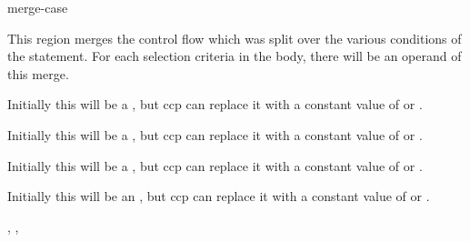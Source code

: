 \begin{instruction}{merge-case}

  \begin{notes}
    This region merges the control flow which was split over the
    various conditions of the  statement.  For each
    selection criteria in the  body, there will be an
    operand of this merge.
  \end{notes}

  \nresults

  \begin{operands}
  \item {}
  \item {} Initially this will be
    a , but \ac{ccp} can replace it with a constant
    value of  or .
  \item {} Initially this will be
    a , but \ac{ccp} can replace it with a constant
    value of  or .
  \item {}
  \item {} Initially this
    will be a , but \ac{ccp} can replace it with a
    constant value of  or .
  \item {} Initially this will be an
    , but \ac{ccp} can replace it with a constant
    value of  or .
  \end{operands}

  \begin{seealso}
    , ,
  \end{seealso}
\end{instruction}


